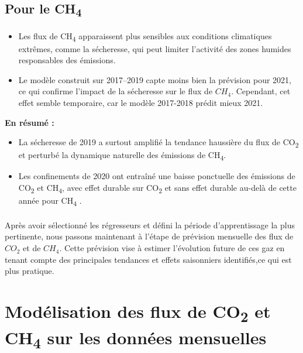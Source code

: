 \documentclass[a4paper,12pt]{report}%
\begin{document}
\subsection*{Pour le CH\textsubscript{4}}
\begin{itemize}
\item Les flux de CH\textsubscript{4} apparaissent plus sensibles aux conditions climatiques extrêmes, comme la sécheresse, qui peut limiter l’activité des zones humides responsables des émissions.
\item Le modèle construit sur 2017–2019 capte moins bien la prévision pour 2021, ce qui confirme l’impact de la sécheresse sur le flux de $CH_4$. Cependant, cet effet semble temporaire, car le modèle 2017-2018 prédit mieux 2021.
    
\end{itemize}

\bigskip

\noindent
\textbf{En résumé :} 
\begin{itemize}
    \item La sécheresse de 2019 a surtout amplifié la tendance haussière du flux de CO\textsubscript{2} et perturbé la dynamique naturelle des émissions de CH\textsubscript{4}.
    \item Les confinements de 2020 ont entraîné une baisse ponctuelle des émissions de CO\textsubscript{2} et CH\textsubscript{4}, avec effet durable sur CO\textsubscript{2} et sans effet durable au-delà de cette année pour CH\textsubscript{4} .
\end{itemize}

\paragraph{} Après avoir sélectionné les régresseurs et défini la période d'apprentissage la plus pertinente, nous passons maintenant à l'étape de prévision mensuelle des flux de $CO_2$ et de $CH_4$. Cette prévision vise à estimer l'évolution future de ces gaz en tenant compte des principales tendances et effets saisonniers identifiés,ce qui est plus pratique.
\vspace{2em}

\section{Modélisation des flux de CO\textsubscript{2} et CH\textsubscript{4} sur les données mensuelles}
\vspace{2em}
\end{document}
